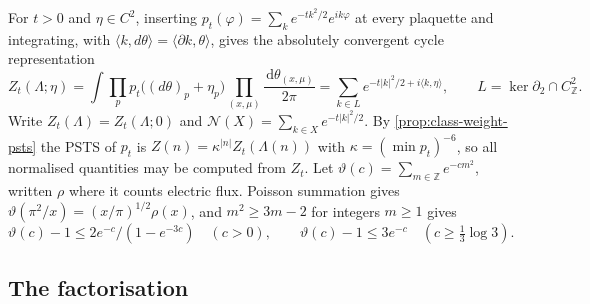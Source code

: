 \documentclass[11pt,a4paper]{amsart}
\theoremstyle{definition}
\theoremstyle{remark}
\numberwithin{equation}{section}
\newcommand{\Z}{\mathbb{Z}}          %
\newcommand{\ip}[2]{\langle #1,#2\rangle}  %
\newcommand{\abs}[1]{\lvert #1\rvert}      %
\newcommand{\dd}{\,\mathrm{d}}             %
\newcommand{\PSTS}{\textup{PSTS}}          %
\begin{document}
For $t>0$ and $\eta\in C^2$, inserting $p_t(\varphi)=\sum_ke^{-tk^2/2}e^{ik\varphi}$ at every plaquette and integrating, with $\ip k{d\theta}=\ip{\partial k}\theta$, gives the absolutely convergent cycle representation
\begin{equation}\label{eq:villain-cycles}
Z_t(\Lambda;\eta)=\int\prod_pp_t\bigl((d\theta)_p+\eta_p\bigr)\prod_{(x,\mu)}\frac{\dd\theta_{(x,\mu)}}{2\pi}=\sum_{k\in L}e^{-t\abs k^2/2+i\ip k\eta},\qquad L=\ker\partial_2\cap C^2_\Z .
\end{equation}
Write $Z_t(\Lambda)=Z_t(\Lambda;0)$ and $\mathcal N(X)=\sum_{k\in X}e^{-t\abs k^2/2}$. By \cref{prop:class-weight-psts} the \PSTS{} of $p_t$ is $Z(n)=\kappa^{|n|}Z_t(\Lambda(n))$ with $\kappa=(\min p_t)^{-6}$, so all normalised quantities may be computed from $Z_t$. Let $\vartheta(c)=\sum_{m\in\Z}e^{-cm^2}$, written $\rho$ where it counts electric flux. Poisson summation gives $\vartheta(\pi^2/x)=(x/\pi)^{1/2}\rho(x)$, and $m^2\ge3m-2$ for integers $m\ge1$ gives
\begin{equation}\label{eq:villain-theta}
\vartheta(c)-1\le2e^{-c}/(1-e^{-3c})\quad(c>0),\qquad \vartheta(c)-1\le3e^{-c}\quad(c\ge\tfrac13\log3).
\end{equation}

\subsection{The factorisation}
\end{document}

